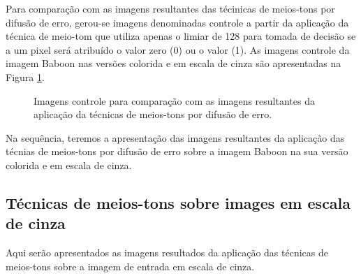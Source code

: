 \documentclass{article}
\begin{document}
Para comparação com as imagens resultantes das técinicas de meios-tons por difusão de erro, gerou-se imagens denominadas controle a partir da aplicação da técnica de meio-tom que utiliza apenas o limiar de 128 para tomada de decisão se a um pixel será atribuído o valor zero (0) ou o valor (1). As imagens controle da imagem Baboon nas versões colorida e em escala de cinza são apresentadas na Figura \ref{fig:imagem:controle}.

\begin{figure}[htp]%
	\centering
	
	\qquad
	
	\caption{Imagens controle para comparação com as imagens resultantes da aplicação da técnicas de meios-tons por difusão de erro.}%
	
	\label{fig:imagem:controle}%
\end{figure}

Na sequência, teremos a apresentação das imagens resultantes da aplicação das técnias de meios-tons por difusão de erro sobre a imagem Baboon na sua versão colorida e em escala de cinza.



\subsection{Técnicas de meios-tons sobre images em escala de cinza}
Aqui serão apresentados as imagens resultados da aplicação das técnicas de meios-tons sobre a imagem de entrada em escala de cinza.
\end{document}

